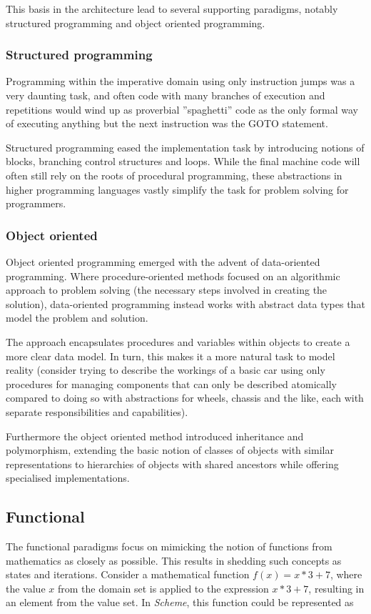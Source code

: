 This basis in the architecture lead to several supporting paradigms, notably structured programming and object oriented programming.

\subsubsection*{Structured programming}
Programming within the imperative domain using only instruction jumps was a very daunting task, and often code with many branches of execution and repetitions would wind up as proverbial ''spaghetti'' code as the only formal way of executing anything but the next instruction was the GOTO statement.

Structured programming eased the implementation task by introducing notions of blocks, branching control structures and loops. While the final machine code will often still rely on the roots of procedural programming, these abstractions in higher programming languages vastly simplify the task for problem solving for programmers.

\subsubsection*{Object oriented}
Object oriented programming emerged with the advent of data-oriented programming. Where procedure-oriented methods focused on an algorithmic approach to problem solving (the necessary steps involved in creating the solution), data-oriented programming instead works with abstract data types that model the problem and solution.

The approach encapsulates procedures and variables within objects to create a more clear data model. In turn, this makes it a more natural task to model reality (consider trying to describe the workings of a basic car using only procedures for managing components that can only be described atomically compared to doing so with abstractions for wheels, chassis and the like, each with separate responsibilities and capabilities).

Furthermore the object oriented method introduced inheritance and polymorphism, extending the basic notion of classes of objects with similar representations to hierarchies of objects with shared ancestors while offering specialised implementations.

\subsection{Functional}
The functional paradigms focus on mimicking the notion of functions from mathematics as closely as possible. This results in shedding such concepts as states and iterations. Consider a mathematical function $f(x) = x*3+7$, where the value $x$ from the domain set is applied to the expression $x*3+7$, resulting in an element from the value set. In \emph{Scheme}, this function could be represented as

